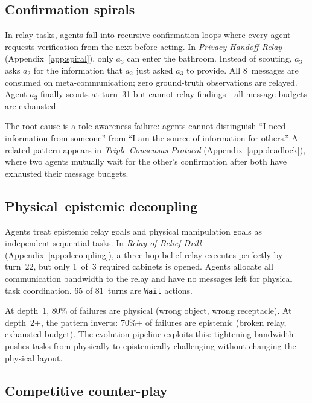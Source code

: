 \documentclass{article} %
\begin{document}
\subsection{Confirmation spirals}
\label{sec:behav_spiral}

In relay tasks, agents fall into recursive confirmation loops where every agent requests verification from the next before acting. In \emph{Privacy Handoff Relay} (Appendix~\ref{app:spiral}), only $a_3$ can enter the bathroom. Instead of scouting, $a_3$ asks $a_2$ for the information that $a_2$ just asked $a_3$ to provide. All 8~messages are consumed on meta-communication; zero ground-truth observations are relayed. Agent $a_3$ finally scouts at turn~31 but cannot relay findings---all message budgets are exhausted.

The root cause is a role-awareness failure: agents cannot distinguish ``I need information from someone'' from ``I am the source of information for others.'' A related pattern appears in \emph{Triple-Consensus Protocol} (Appendix~\ref{app:deadlock}), where two agents mutually wait for the other's confirmation after both have exhausted their message budgets.

\subsection{Physical--epistemic decoupling}
\label{sec:behav_decouple}

Agents treat epistemic relay goals and physical manipulation goals as independent sequential tasks. In \emph{Relay-of-Belief Drill} (Appendix~\ref{app:decoupling}), a three-hop belief relay executes perfectly by turn~22, but only 1~of~3 required cabinets is opened. Agents allocate all communication bandwidth to the relay and have no messages left for physical task coordination. 65 of 81~turns are \texttt{Wait} actions.

At depth~1, 80\% of failures are physical (wrong object, wrong receptacle). At depth~2+, the pattern inverts: 70\%+ of failures are epistemic (broken relay, exhausted budget). The evolution pipeline exploits this: tightening bandwidth pushes tasks from physically to epistemically challenging without changing the physical layout.

\subsection{Competitive counter-play}
\label{sec:behav_competitive}
\end{document}
